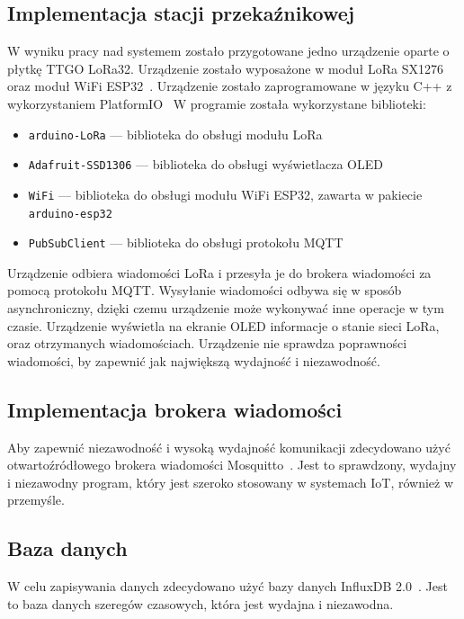 \subsection{Implementacja stacji przekaźnikowej}
W wyniku pracy nad systemem zostało przygotowane jedno urządzenie oparte o płytkę TTGO LoRa32. Urządzenie zostało wyposażone w moduł LoRa SX1276~\cite{ESP32:sx1276-doc} oraz moduł WiFi ESP32~\cite{ESP32:datasheet}. Urządzenie zostało zaprogramowane w języku C++ z wykorzystaniem PlatformIO~\cite{tool:pio} W programie została wykorzystane biblioteki:
\begin{itemize}
    \item \texttt{arduino-LoRa} — biblioteka do obsługi modułu LoRa~\cite{ESP32:lora-lib}

    \item \texttt{Adafruit-SSD1306} — biblioteka do obsługi wyświetlacza OLED~\cite{ESP32:Adafruit-SSD1306}
    \item \texttt{WiFi} — biblioteka do obsługi modułu WiFi ESP32, zawarta w pakiecie \texttt{arduino-esp32}~\cite{ESP32:Arduino}
    \item \texttt{PubSubClient} — biblioteka do obsługi protokołu MQTT~\cite{ESP32:PubSubClient}
\end{itemize}
Urządzenie odbiera wiadomości LoRa i przesyła je do brokera wiadomości za pomocą protokołu MQTT. Wysyłanie wiadomości odbywa się w sposób asynchroniczny, dzięki czemu urządzenie może wykonywać inne operacje w tym czasie. Urządzenie wyświetla na ekranie OLED informacje o stanie sieci LoRa, oraz otrzymanych wiadomościach. Urządzenie nie sprawdza poprawności wiadomości, by zapewnić jak największą wydajność i niezawodność.

\subsection{Implementacja brokera wiadomości}
Aby zapewnić niezawodność i wysoką wydajność komunikacji zdecydowano użyć otwartoźródłowego brokera wiadomości Mosquitto~\cite{tool:mosquitto}. Jest to sprawdzony, wydajny i niezawodny program, który jest szeroko stosowany w systemach IoT, również w przemyśle.~\cite{tool:mosquitto}

\subsection{Baza danych}
W celu zapisywania danych zdecydowano użyć bazy danych InfluxDB 2.0~\cite{tool:influxdb}. Jest to baza danych szeregów czasowych, która jest wydajna i niezawodna.~\cite{tool:influxdb}

